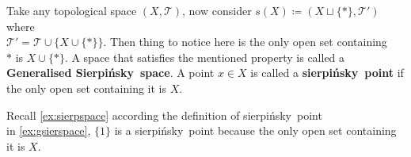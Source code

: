 \documentclass{scrartcl} %
\newcommand{\Tau}{\mathcal{T}}
\newcommand{\sSp}{Sierpi\'nsky}
\newcommand{\ssp}{sierpi\'nsky}
\begin{document}
\begin{example}
	\label{ex:gsierspace}
	Take any topological space 
	$\left(X, \Tau\right)$, now consider 
	$s(X) \coloneq
	\left( X \sqcup \{*\}, \Tau'\right)$ where \\
	$\Tau' = \Tau \cup \{X \cup \{*\} \}$. Then
	thing to notice here is the only open set
	containing\\ $*$ is $X \cup \{*\}$. A space
	that satisfies the mentioned property is called
	a\\ \textbf{Generalised \sSp \ space}. A point 
	$x \in X$ is called a \textbf{\ssp \ point}
	if the only open set containing it is $X$.
\end{example}
\begin{remark}
	Recall \autoref{ex:sierpspace} according 
	the definition
	of \ssp \ point\\ in \autoref{ex:gsierspace}, $\{1\}$
	is a \ssp \ point because the only open set
	containing it is $X$.
\end{remark}
\newpage
\end{document}

